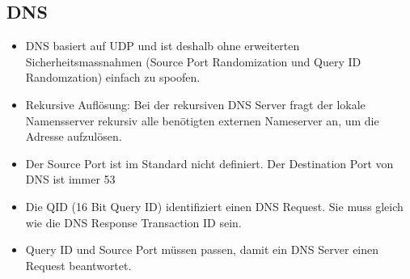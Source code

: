 \subsection{DNS}
\begin{itemize}
	\item DNS basiert auf UDP und ist deshalb ohne erweiterten Sicherheitsmassnahmen (Source Port Randomization und Query ID Randomzation) einfach zu spoofen.
	\item Rekursive Auflösung: Bei der rekursiven DNS Server fragt der lokale Namensserver rekursiv alle benötigten externen Nameserver an, um die Adresse aufzulösen.
	\item Der Source Port ist im Standard nicht definiert. Der Destination Port von DNS ist immer 53
	\item Die QID (16 Bit Query ID) identifiziert einen DNS Request. Sie muss gleich wie die DNS Response Transaction ID sein.
	\item Query ID und Source Port müssen passen, damit ein DNS Server einen Request beantwortet.
\end{itemize}

